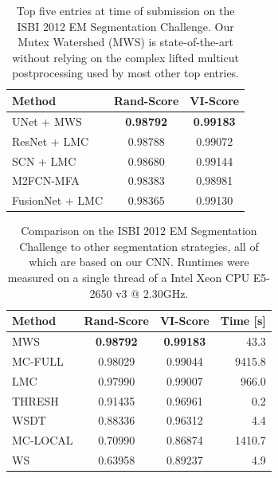 \begin{table}[t]
    \centering
        \begin{tabular}{l c c}
            \toprule
            Method                                  & \hspace{-0.5cm}Rand-Score & VI-Score \\        
            \midrule
            UNet + MWS                              & \textbf{0.98792} & \textbf{0.99183}\\        
            ResNet + LMC \cite{xiao2018deep}        & 0.98788   &  0.99072\\
            SCN + LMC \cite{weiler2017learning}     & 0.98680   &  0.99144\\
            M2FCN-MFA \cite{shen2017multi}         & 0.98383   &  0.98981\\
            FusionNet + LMC \cite{quan2016fusionnet}& 0.98365   &  0.99130\\ 
        \end{tabular}
        \caption{Top five entries at time of submission on the ISBI 2012 EM Segmentation Challenge. Our Mutex Watershed (MWS) is state-of-the-art without relying on the complex lifted multicut postprocessing used by most other top entries.}
        \label{tab:isbi-leaderboard}
\end{table}
\begin{table}[t]
    \centering
        \begin{tabular}{l c c r}
            \toprule
            Method   & \hspace{-0.5cm}Rand-Score & VI-Score & Time [s] \\        
            \midrule
            MWS      & \textbf{0.98792} & \textbf{0.99183} & 43.3 \\        
            MC-FULL  & 0.98029   & 0.99044 & 9415.8 \\
            LMC      & 0.97990   & 0.99007 &  966.0 \\
            THRESH   & 0.91435   & 0.96961 & 0.2 \\
            WSDT     & 0.88336   & 0.96312 & 4.4 \\
            MC-LOCAL & 0.70990   & 0.86874 & 1410.7 \\
            WS       & 0.63958   & 0.89237 & 4.9 \\
        \end{tabular}
        \caption{Comparison on the ISBI 2012 EM Segmentation Challenge to other segmentation strategies, all of which are based on our CNN. Runtimes were measured on a single thread of a Intel Xeon CPU E5-2650 v3 @ 2.30GHz.}
        \label{tab:isbi-baselines}
\end{table}

